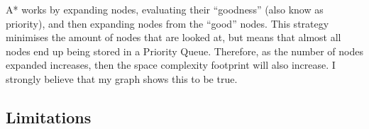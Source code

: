 \documentclass[a4paper]{article}
\begin{document}
A* works by expanding nodes, evaluating their ``goodness'' (also know as priority), and then expanding nodes from the ``good'' nodes.
This strategy minimises the amount of nodes that are looked at, but means that almost all nodes end up being stored in a Priority Queue.
Therefore, as the number of nodes expanded increases, then the space complexity footprint will also increase.
I strongly believe that my graph shows this to be true.

\subsection{Limitations}


\end{document}
